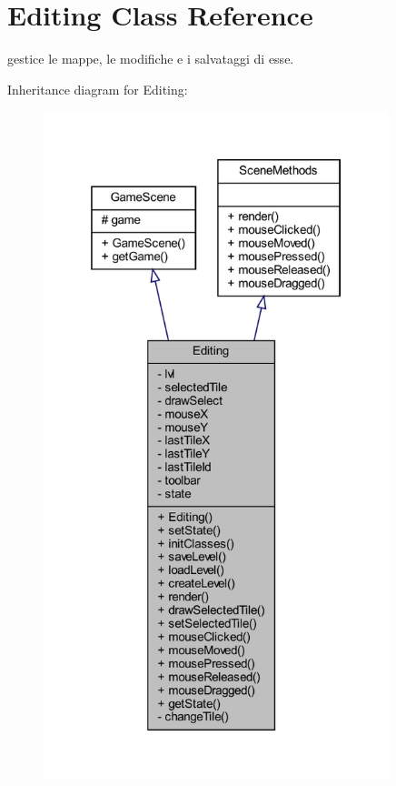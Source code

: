 \hypertarget{classscenes_1_1_editing}{}\section{Editing Class Reference}
\label{classscenes_1_1_editing}


gestice le mappe, le modifiche e i salvataggi di esse.  




Inheritance diagram for Editing\+:\nopagebreak
\begin{figure}[H]
\begin{center}
\leavevmode
\includegraphics[height=550pt]{classscenes_1_1_editing__inherit__graph}
\end{center}
\end{figure}


